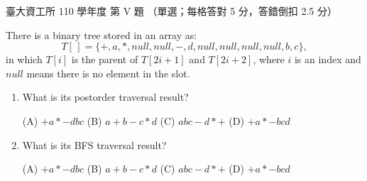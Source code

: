 \begin{pastexam}[label={px:ntu-110-dsaa-05}]{臺大資工所 110 學年度 第 V 題}
（單選；每格答對 5 分，答錯倒扣 2.5 分）

There is a binary tree stored in an array as:
\[T[\,]=\{+,a,*,null,null,-,d,null,null,null,null,b,c\},\]
in which $T[i]$ is the parent of $T[2i+1]$ and $T[2i+2]$, where $i$ is an index and $null$
means there is no element in the slot.
\begin{enumerate}[label=(\alph*)]
\item What is its postorder traversal result? \underline{}

(A) $+a*-dbc$ \qquad (B) $a+b-c*d$ \qquad (C) $abc-d*+$ \qquad (D) $+a*-bcd$
\item What is its BFS traversal result? \underline{}

(A) $+a*-dbc$ \qquad (B) $a+b-c*d$ \qquad (C) $abc-d*+$ \qquad (D) $+a*-bcd$
\end{enumerate}
\end{pastexam}

